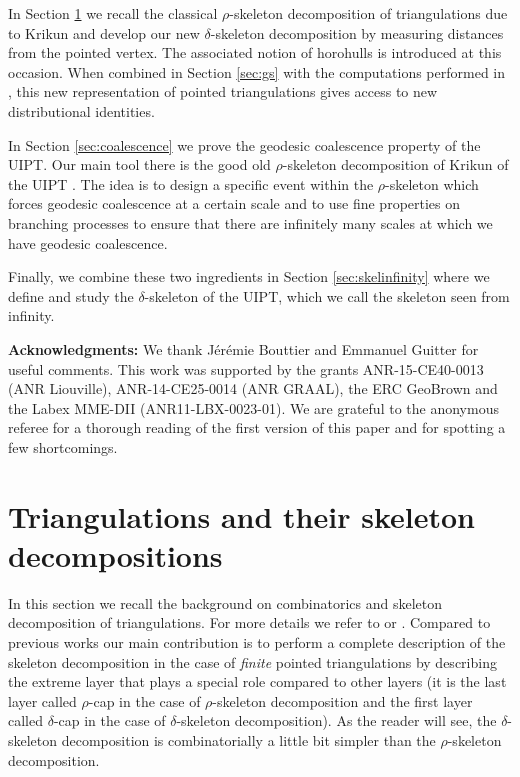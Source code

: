 \documentclass[10pt]{amsart}
\theoremstyle{definition}\newtheorem{defi}[theo]{Definition}\newtheorem{rema}[theo]{Remark}\newtheorem{exam}[theo]{Example}\newtheorem{exem}[theo]{Example}\newtheorem{nota}[theo]{Notation}
\begin{document}
In Section \ref{sec:skeletongeneral} we recall the classical $\rho$-skeleton decomposition of triangulations due to Krikun and develop our new $\delta$-skeleton decomposition by measuring distances from the pointed vertex. The associated notion of horohulls is introduced at this occasion. When combined  in Section \ref{sec:gs} with the computations performed in \cite{M}, this new representation of pointed triangulations gives access to new distributional identities.

In Section \ref{sec:coalescence} we prove the geodesic coalescence property of the UIPT. Our main tool there is the good old $\rho$-skeleton decomposition of Krikun of the UIPT \cite{Kr}. The idea is to design a specific event within the $\rho$-skeleton which forces geodesic coalescence at a certain scale and to use fine properties on branching processes to ensure that there are infinitely many scales at which we have geodesic coalescence.

Finally, we combine these two ingredients in Section \ref{sec:skelinfinity} where we define and study the $\delta$-skeleton of the UIPT, which we call the skeleton seen from infinity.

\bigskip

\noindent \textbf{Acknowledgments:} We thank J\'er\'emie Bouttier and Emmanuel Guitter for useful comments. This work was supported by the grants ANR-15-CE40-0013 (ANR Liouville),
ANR-14-CE25-0014 (ANR GRAAL), the ERC GeoBrown and the Labex MME-DII (ANR11-LBX-0023-01). {We are grateful to the anonymous referee for a thorough reading of the first version of this paper and for spotting a few shortcomings.}

\tableofcontents


\section{Triangulations and their skeleton decompositions} \label{sec:skeletongeneral}
In this section we recall the background on combinatorics and skeleton decomposition of triangulations. For more details we refer to \cite{CLGfpp} or \cite{M}. Compared to previous works our main contribution is to perform a complete description of the skeleton decomposition in the case of \emph{finite} pointed triangulations by describing the extreme layer that plays a special role compared to other layers (it is the last layer called $\rho$-cap in the case of $\rho$-skeleton decomposition and the first layer called $\delta$-cap in the case of $\delta$-skeleton decomposition). As the reader will see, the $\delta$-skeleton decomposition is combinatorially a little bit simpler than the $\rho$-skeleton decomposition.
\end{document}
